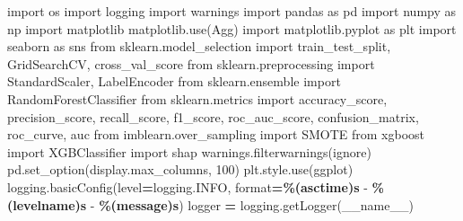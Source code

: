 \documentclass[preprint, 3p,
authoryear]{elsarticle} %
\newenvironment{Shaded}{\begin{snugshade}}{\end{snugshade}}
\newcommand{\BuiltInTok}[1]{#1}
\newcommand{\DecValTok}[1]{\textcolor[rgb]{0.00,0.00,0.81}{#1}}
\newcommand{\ImportTok}[1]{#1}
\newcommand{\NormalTok}[1]{#1}
\newcommand{\OperatorTok}[1]{\textcolor[rgb]{0.81,0.36,0.00}{\textbf{#1}}}
\newcommand{\SpecialCharTok}[1]{\textcolor[rgb]{0.81,0.36,0.00}{\textbf{#1}}}
\newcommand{\StringTok}[1]{\textcolor[rgb]{0.31,0.60,0.02}{#1}}
\newcommand{\VariableTok}[1]{\textcolor[rgb]{0.00,0.00,0.00}{#1}}
\begin{document}
\begin{Shaded}
\begin{Highlighting}[]
\ImportTok{import}\NormalTok{ os}
\ImportTok{import}\NormalTok{ logging}
\ImportTok{import}\NormalTok{ warnings}
\ImportTok{import}\NormalTok{ pandas }\ImportTok{as}\NormalTok{ pd}
\ImportTok{import}\NormalTok{ numpy }\ImportTok{as}\NormalTok{ np}
\ImportTok{import}\NormalTok{ matplotlib}
\NormalTok{matplotlib.use(}\StringTok{\textquotesingle{}Agg\textquotesingle{}}\NormalTok{)}
\ImportTok{import}\NormalTok{ matplotlib.pyplot }\ImportTok{as}\NormalTok{ plt}
\ImportTok{import}\NormalTok{ seaborn }\ImportTok{as}\NormalTok{ sns}
\ImportTok{from}\NormalTok{ sklearn.model\_selection }\ImportTok{import}\NormalTok{ train\_test\_split, GridSearchCV, cross\_val\_score}
\ImportTok{from}\NormalTok{ sklearn.preprocessing }\ImportTok{import}\NormalTok{ StandardScaler, LabelEncoder}
\ImportTok{from}\NormalTok{ sklearn.ensemble }\ImportTok{import}\NormalTok{ RandomForestClassifier}
\ImportTok{from}\NormalTok{ sklearn.metrics }\ImportTok{import}\NormalTok{ accuracy\_score, precision\_score, recall\_score, f1\_score, roc\_auc\_score, confusion\_matrix, roc\_curve, auc}
\ImportTok{from}\NormalTok{ imblearn.over\_sampling }\ImportTok{import}\NormalTok{ SMOTE}
\ImportTok{from}\NormalTok{ xgboost }\ImportTok{import}\NormalTok{ XGBClassifier}
\ImportTok{import}\NormalTok{ shap}
\NormalTok{warnings.filterwarnings(}\StringTok{\textquotesingle{}ignore\textquotesingle{}}\NormalTok{)}
\NormalTok{pd.set\_option(}\StringTok{\textquotesingle{}display.max\_columns\textquotesingle{}}\NormalTok{, }\DecValTok{100}\NormalTok{)}
\NormalTok{plt.style.use(}\StringTok{\textquotesingle{}ggplot\textquotesingle{}}\NormalTok{)}
\NormalTok{logging.basicConfig(level}\OperatorTok{=}\NormalTok{logging.INFO, }\BuiltInTok{format}\OperatorTok{=}\StringTok{\textquotesingle{}}\SpecialCharTok{\%(asctime)s}\StringTok{ {-} }\SpecialCharTok{\%(levelname)s}\StringTok{ {-} }\SpecialCharTok{\%(message)s}\StringTok{\textquotesingle{}}\NormalTok{)}
\NormalTok{logger }\OperatorTok{=}\NormalTok{ logging.getLogger(}\VariableTok{\_\_name\_\_}\NormalTok{)}


\end{Highlighting}
\end{Shaded}
\end{document}
